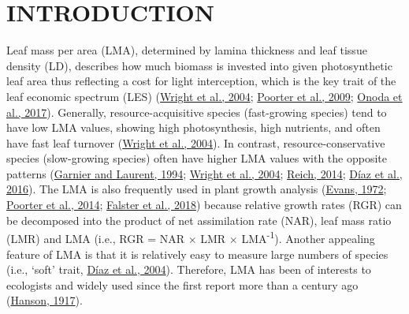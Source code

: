 \documentclass[
  12pt,
  a4paper,
,tablecaptionabove
]{scrartcl}
\begin{document}
\hypertarget{introduction}{%
\section{INTRODUCTION}\label{introduction}}

Leaf mass per area (LMA), determined by lamina thickness and leaf tissue
density (LD), describes how much biomass is invested into given
photosynthetic leaf area thus reflecting a cost for light interception,
which is the key trait of the leaf economic spectrum (LES)
(\protect\hyperlink{ref-Wright2004a}{Wright et al., 2004};
\protect\hyperlink{ref-Poorter2009}{Poorter et al., 2009};
\protect\hyperlink{ref-Onoda2017}{Onoda et al., 2017}). Generally,
resource-acquisitive species (fast-growing species) tend to have low LMA
values, showing high photosynthesis, high nutrients, and often have fast
leaf turnover (\protect\hyperlink{ref-Wright2004a}{Wright et al.,
2004}). In contrast, resource-conservative species (slow-growing
species) often have higher LMA values with the opposite patterns
(\protect\hyperlink{ref-Garnier1994}{Garnier and Laurent, 1994};
\protect\hyperlink{ref-Wright2004a}{Wright et al., 2004};
\protect\hyperlink{ref-Reich2014}{Reich, 2014};
\protect\hyperlink{ref-Diaz2016}{Díaz et al., 2016}). The LMA is also
frequently used in plant growth analysis
(\protect\hyperlink{ref-Evans1972}{Evans, 1972};
\protect\hyperlink{ref-Poorter2014}{Poorter et al., 2014};
\protect\hyperlink{ref-Falster2018}{Falster et al., 2018}) because
relative growth rates (RGR) can be decomposed into the product of net
assimilation rate (NAR), leaf mass ratio (LMR) and LMA (i.e., RGR = NAR
\(\times\) LMR \(\times\) LMA\textsuperscript{-1}). Another appealing
feature of LMA is that it is relatively easy to measure large numbers of
species (i.e., `soft' trait, \protect\hyperlink{ref-Diaz2004}{Díaz et
al., 2004}). Therefore, LMA has been of interests to ecologists and
widely used since the first report more than a century ago
(\protect\hyperlink{ref-Hanson1917}{Hanson, 1917}).
\end{document}
